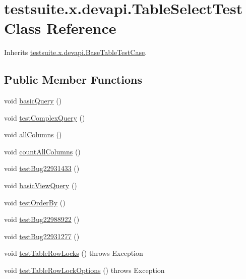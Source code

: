\hypertarget{classtestsuite_1_1x_1_1devapi_1_1_table_select_test}{}\section{testsuite.\+x.\+devapi.\+Table\+Select\+Test Class Reference}
\label{classtestsuite_1_1x_1_1devapi_1_1_table_select_test}


Inherits \mbox{\hyperlink{classtestsuite_1_1x_1_1devapi_1_1_base_table_test_case}{testsuite.\+x.\+devapi.\+Base\+Table\+Test\+Case}}.

\subsection*{Public Member Functions}
\begin{DoxyCompactItemize}
\item 
void \mbox{\hyperlink{classtestsuite_1_1x_1_1devapi_1_1_table_select_test_ab605b476d74b9ab2c2ec5141601f4e91}{basic\+Query}} ()
\item 
void \mbox{\hyperlink{classtestsuite_1_1x_1_1devapi_1_1_table_select_test_ac0b53e53f46b498bc963c29572098c94}{test\+Complex\+Query}} ()
\item 
void \mbox{\hyperlink{classtestsuite_1_1x_1_1devapi_1_1_table_select_test_a5cf2714c4dbac75f392d1920b7b82b2a}{all\+Columns}} ()
\item 
void \mbox{\hyperlink{classtestsuite_1_1x_1_1devapi_1_1_table_select_test_a3754d5145287a62671e555cade171368}{count\+All\+Columns}} ()
\item 
void \mbox{\hyperlink{classtestsuite_1_1x_1_1devapi_1_1_table_select_test_afd12723c984438be5ec3f1f4c7653f12}{test\+Bug22931433}} ()
\item 
void \mbox{\hyperlink{classtestsuite_1_1x_1_1devapi_1_1_table_select_test_ac765bcf8d10c468cadef1120603af0b8}{basic\+View\+Query}} ()
\item 
void \mbox{\hyperlink{classtestsuite_1_1x_1_1devapi_1_1_table_select_test_a6b5dc109f28e5bff71ee771b479a5746}{test\+Order\+By}} ()
\item 
void \mbox{\hyperlink{classtestsuite_1_1x_1_1devapi_1_1_table_select_test_ab8bd8f7764e85cb1fca60737990788e0}{test\+Bug22988922}} ()
\item 
void \mbox{\hyperlink{classtestsuite_1_1x_1_1devapi_1_1_table_select_test_a87677fbfc2a5861e0415b7c01ef9e558}{test\+Bug22931277}} ()
\item 
void \mbox{\hyperlink{classtestsuite_1_1x_1_1devapi_1_1_table_select_test_a86c3f2a244e84e2218335ab808b0ba98}{test\+Table\+Row\+Locks}} ()  throws Exception 
\item 
void \mbox{\hyperlink{classtestsuite_1_1x_1_1devapi_1_1_table_select_test_aefa93f23559107b6c1808be6604d31dc}{test\+Table\+Row\+Lock\+Options}} ()  throws Exception 
\end{DoxyCompactItemize}
